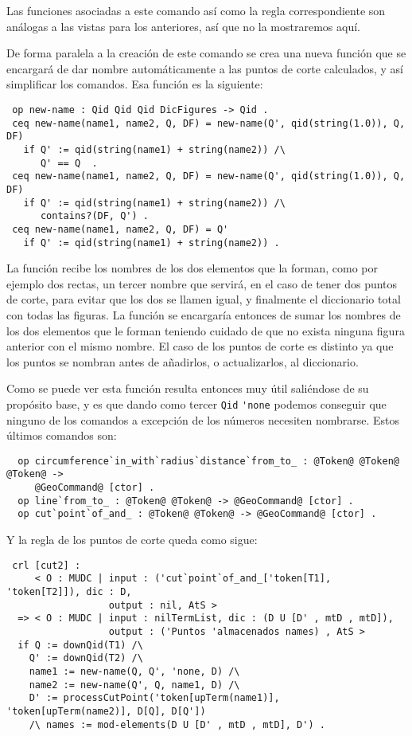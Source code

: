 Las funciones asociadas a este comando así como la regla correspondiente son análogas a las vistas para los anteriores, así que no la mostraremos aquí. \par

De forma paralela a la creación de este comando se crea una nueva función que se encargará de dar nombre automáticamente a las puntos de corte calculados, y así simplificar los comandos. Esa función es la siguiente:

{\codesize
\begin{verbatim}
 op new-name : Qid Qid Qid DicFigures -> Qid .
 ceq new-name(name1, name2, Q, DF) = new-name(Q', qid(string(1.0)), Q, DF)
   if Q' := qid(string(name1) + string(name2)) /\
      Q' == Q  . 
 ceq new-name(name1, name2, Q, DF) = new-name(Q', qid(string(1.0)), Q, DF)
   if Q' := qid(string(name1) + string(name2)) /\
      contains?(DF, Q') .
 ceq new-name(name1, name2, Q, DF) = Q'
   if Q' := qid(string(name1) + string(name2)) .
\end{verbatim}
}

La función recibe los nombres de los dos elementos que la forman, como por ejemplo dos rectas, un tercer nombre que servirá, en el caso de tener dos puntos de corte, para evitar que los dos se llamen igual, y finalmente el diccionario total con todas las figuras. La función se encargaría entonces de sumar los nombres de los dos elementos que le forman teniendo cuidado de que no exista ninguna figura anterior con el mismo nombre. El caso de los puntos de corte es distinto ya que los puntos se nombran antes de añadirlos, o actualizarlos, al diccionario.\par

Como se puede ver esta función resulta entonces muy útil saliéndose de su propósito base, y es que dando como tercer \verb"Qid" \verb"'none" podemos conseguir que ninguno de los comandos a excepción de los números necesiten nombrarse. Estos últimos comandos son:

{\codesize
\begin{verbatim}
  op circumference`in_with`radius`distance`from_to_ : @Token@ @Token@ @Token@ ->  
     @GeoCommand@ [ctor] .
  op line`from_to_ : @Token@ @Token@ -> @GeoCommand@ [ctor] .
  op cut`point`of_and_ : @Token@ @Token@ -> @GeoCommand@ [ctor] .
\end{verbatim}
}

Y la regla de los puntos de corte queda como sigue:

{\codesize
\begin{verbatim}
 crl [cut2] :
     < O : MUDC | input : ('cut`point`of_and_['token[T1], 'token[T2]]), dic : D,
                  output : nil, AtS >
  => < O : MUDC | input : nilTermList, dic : (D U [D' , mtD , mtD]),
                  output : ('Puntos 'almacenados names) , AtS >
  if Q := downQid(T1) /\
    Q' := downQid(T2) /\
    name1 := new-name(Q, Q', 'none, D) /\
    name2 := new-name(Q', Q, name1, D) /\
    D' := processCutPoint('token[upTerm(name1)], 'token[upTerm(name2)], D[Q], D[Q']) 
    /\ names := mod-elements(D U [D' , mtD , mtD], D') .
\end{verbatim}
}

